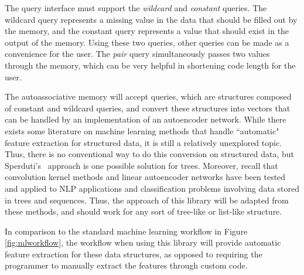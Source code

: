 \documentclass{sig-alternate}
\begin{document}
The query interface must support the \textit{wildcard} and \textit{constant} queries. The wildcard
query represents a missing value in the data that should be filled out by the memory, and the constant
query represents a value that should exist in the output of the memory. Using these two queries,
other queries can be made as a convenience for the user. The \textit{pair} query simultaneously
passes two values through the memory, which can be very helpful in shortening code length for the user.

The autoassociative memory will accept queries, which are structures composed of constant and wildcard queries,
and convert these structures into vectors that can be handled by an implementation of an autoencoder
network. While there exists some literature on machine learning methods that handle ``automatic" feature 
extraction for structured data, it is still a relatively unexplored topic. Thus, there is no conventional way to do this conversion on structured data, but
Sperduti's~\cite{sperduti} approach is one possible solution for trees.
Moreover, recall that convolution kernel methods and 
linear autoencoder networks have been tested and applied to NLP applications and classification problems involving data 
stored in trees and sequences. Thus, the approach of this library will be adapted from these methods, and should work for any sort 
of tree-like or list-like structure.



In comparison to the standard machine learning workflow in Figure \ref{fig:mlworkflow}, the workflow
when using this library will provide automatic feature extraction for these data structures, as opposed to
requiring the programmer to manually extract the features through custom code.

\end{document}
